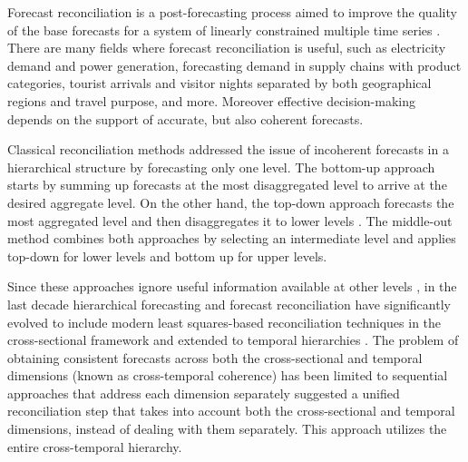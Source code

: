 \documentclass[a4paper,11pt]{article}
\theoremstyle{definition}
\begin{document}
Forecast reconciliation is a post-forecasting process aimed to improve the quality of the base forecasts for a system of linearly constrained multiple time series 
\citep{hyndman2011, panagiotelis2021, giro2022}. There are many fields where forecast reconciliation is useful, such as electricity demand and power generation, forecasting demand in supply chains with product categories, tourist arrivals and visitor nights separated by both geographical regions and travel purpose, and more. Moreover effective decision-making depends on the support of accurate, but also coherent forecasts.

Classical reconciliation methods addressed the issue of incoherent forecasts in a hierarchical structure by forecasting only one level. The bottom-up approach \citep{dunn1976} starts by summing up forecasts at the most disaggregated level to arrive at the desired aggregate level. On the other hand, the top-down approach \citep{gross1990} forecasts the most aggregated level and then disaggregates it to lower levels \citep{fliedner2001, athanasopoulos2009}. The middle-out method \citep{athanasopoulos2009} combines both approaches by selecting an intermediate level and applies top-down for lower levels and bottom up for upper levels.

Since these approaches ignore useful information available at other levels 	\citep{pennings2017}, in the last decade hierarchical forecasting and forecast reconciliation have significantly evolved to include modern least squares-based reconciliation techniques in the cross-sectional framework \citep{hyndman2011, wickramasuriya2019, panagiotelis2021} and extended to temporal hierarchies \citep{athanasopoulos2017, nystrup2020}. The problem of obtaining consistent forecasts across both the cross-sectional and temporal dimensions (known as cross-temporal coherence) has been limited to sequential approaches that address each dimension separately  \citep{kourentzes2019, yagli2019, punia2020, spiliotis2020, difonzo2023} suggested a unified reconciliation step that takes into account both the cross-sectional and temporal dimensions, instead of dealing with them separately. This approach utilizes the entire cross-temporal hierarchy.
\end{document}
